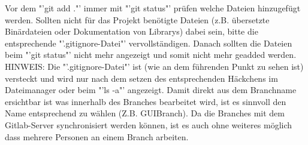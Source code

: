 Vor dem "'git add ."' immer mit "'git status"' prüfen welche Dateien hinzugefügt werden. Sollten nicht für das Projekt benötigte Dateien (z.B. übersetzte Binärdateien oder Dokumentation von Librarys) dabei sein, bitte die entsprechende "'.gitignore-Datei"' vervollständigen. Danach sollten die Dateien beim "'git status"' nicht mehr angezeigt und somit nicht mehr geadded werden.\\
HINWEIS: Die "'.gitignore-Datei"' ist (wie an dem führenden Punkt zu sehen ist) versteckt und wird nur nach dem setzen des entsprechenden Häckchens im Dateimanager oder beim "'ls -a"' angezeigt.
\nsecend
{}
Damit direkt aus dem Branchname ersichtbar ist was innerhalb des Branches bearbeitet wird, ist es sinnvoll den Name entsprechend zu wählen (Z.B. GUIBranch). Da die Branches mit dem Gitlab-Server synchronisiert werden können, ist es auch ohne weiteres möglich dass mehrere Personen an einem Branch arbeiten.
\nsecend
\nsecend
\nsecend